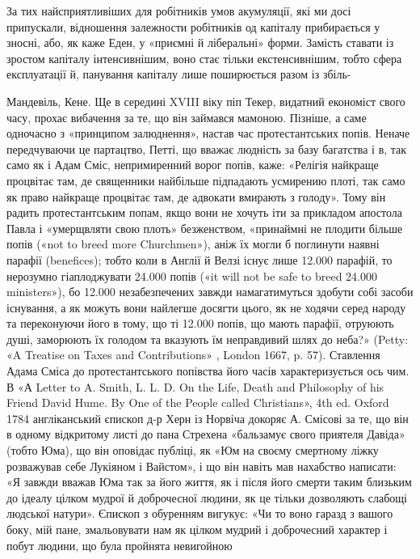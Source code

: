 За тих найсприятливіших для робітників умов акумуляції,
які ми досі припускали, відношення залежности робітників од
капіталу прибирається у зносні, або, як каже Еден, у «приємні
й ліберальні» форми. Замість ставати із зростом капіталу інтенсивнішим,
воно стає тільки екстенсивнішим, тобто сфера експлуатації
й, панування капіталу лише поширюється разом із збіль-

Мандевіль, Кене. Ще в середині XVIII віку піп Текер, видатний економіст
свого часу, прохає вибачення за те, що він займався мамоною. Пізніше,
а саме одночасно з «принципом залюднення», настав час протестантських
попів. Неначе передчуваючи це партацтво, Петті, що вважає людність
за базу багатства і в, так само як і Адам Сміс, непримиренний
ворог попів, каже: «Релігія найкраще процвітає там, де священники найбільше
підпадають усмирению плоті, так само як право найкраще процвітає
там, де адвокати вмирають з голоду». Тому він радить протестантським
попам, якщо вони не хочуть іти за прикладом апостола Павла
і «умерщвляти свою плоть» безженством, «принаймні не плодити більше
попів («not to breed more Churchmen»), аніж їх могли б поглинути наявні
парафії (benefices); тобто коли в Англії й Велзі існує лише 12.000 парафій,
то нерозумно гіаплоджувати 24.000 попів («it will not be safe to breed
24.000 ministers»), бо 12.000 незабезпечених завжди намагатимуться
здобути собі засоби існування, а як можуть вони найлегше досягти цього,
як не ходячи серед народу та переконуючи його в тому, що ті 12.000 попів,
що мають парафії, отруюють душі, заморюють їх голодом та вказують
їм неправдивий шлях до неба?» (Petty: «A Treatise on Taxes and Contributions»
, London 1667, p. 57). Ставлення Адама Сміса до протестантського
попівства його часів характеризується ось чим. В «А Letter to A. Smith,
L. L. D. On the Life, Death and Philosophy of his Friend David Hume.
By One of the People called Christians», 4th ed. Oxford 1784 англіканський
єпископ д-р Херн із Норвіча докоряє А. Смісові за те, що він в одному
відкритому листі до пана Стрехена «бальзамує свого приятеля Давіда»
(тобто Юма), що він оповідає публіці, як «Юм на своєму смертному ліжку
розважував себе Лукіяном і Вайстом», і що він навіть мав нахабство написати:
«Я завжди вважав Юма так за його життя, як і після його смерти
таким близьким до ідеалу цілком мудрої й доброчесної людини, як це тільки
дозволяють слабощі людської натури». Єпископ з обуренням вигукує:
«Чи то воно гаразд з вашого боку, мій пане, змальовувати нам як цілком
мудрий і доброчесний характер і побут людини, що була пройнята невигойною
